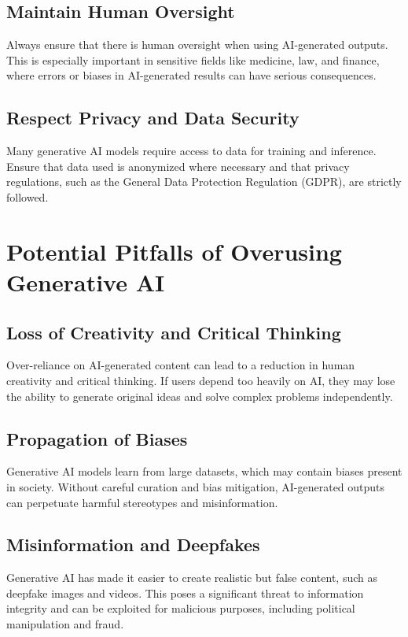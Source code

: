 \documentclass{article}
\begin{document}
\subsection{Maintain Human Oversight}
Always ensure that there is human oversight when using AI-generated outputs. This is especially important in sensitive fields like medicine, law, and finance, where errors or biases in AI-generated results can have serious consequences.

\subsection{Respect Privacy and Data Security}
Many generative AI models require access to data for training and inference. Ensure that data used is anonymized where necessary and that privacy regulations, such as the General Data Protection Regulation (GDPR), are strictly followed.

\section{Potential Pitfalls of Overusing Generative AI}

\subsection{Loss of Creativity and Critical Thinking}
Over-reliance on AI-generated content can lead to a reduction in human creativity and critical thinking. If users depend too heavily on AI, they may lose the ability to generate original ideas and solve complex problems independently.

\subsection{Propagation of Biases}
Generative AI models learn from large datasets, which may contain biases present in society. Without careful curation and bias mitigation, AI-generated outputs can perpetuate harmful stereotypes and misinformation.

\subsection{Misinformation and Deepfakes}
Generative AI has made it easier to create realistic but false content, such as deepfake images and videos. This poses a significant threat to information integrity and can be exploited for malicious purposes, including political manipulation and fraud.
\end{document}
